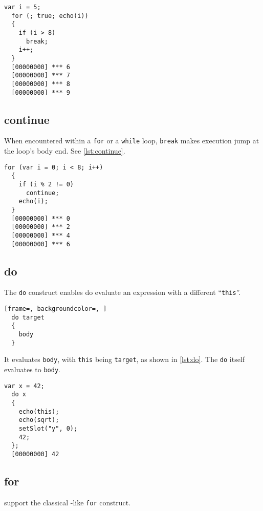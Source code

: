 \documentclass[openright,twoside,12pt]{report}
\begin{document}
\begin{lstlisting}[caption=Using break, label=lst:break,
  float=\floatpos]
  var i = 5;
  for (; true; echo(i))
  {
    if (i > 8)
      break;
    i++;
  }
  [00000000] *** 6
  [00000000] *** 7
  [00000000] *** 8
  [00000000] *** 9
\end{lstlisting}

\subsection{continue}

When encountered within a \lstinline|for| or a \lstinline|while| loop,
\lstinline|break| makes execution jump at the loop's body end. See
\autoref{lst:continue}.

\begin{lstlisting}[caption=Using continue, label=lst:continue,
  float=\floatpos]
  for (var i = 0; i < 8; i++)
  {
    if (i % 2 != 0)
      continue;
    echo(i);
  }
  [00000000] *** 0
  [00000000] *** 2
  [00000000] *** 4
  [00000000] *** 6
\end{lstlisting}

\subsection{do}

The \lstinline|do| construct enables do evaluate an expression with a
different ``\lstinline|this|''.

\begin{lstlisting}[frame=, backgroundcolor=, ]
  do target
  {
    body
  }
\end{lstlisting}

It evaluates \lstinline|body|, with \lstinline|this| being
\lstinline|target|, as shown in \autoref{lst:do}.  The \lstinline|do| itself
evaluates to \lstinline|body|.

\begin{lstlisting}[caption=Using \lstinline|do|, label=lst:do,
  float=\floatpos]
  var x = 42;
  do x
  {
    echo(this);
    echo(sqrt);
    setSlot("y", 0);
    42;
  };
  [00000000] 42
\end{lstlisting}

\subsection{for}

\us support the classical \C-like \lstinline|for| construct.
\end{document}
